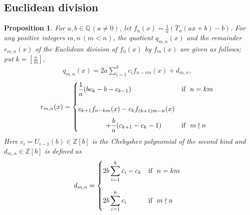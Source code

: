 \documentclass[a4paper, 11pt]{amsart}
\numberwithin{equation}{section}
\newtheorem{prop}[thm]{Proposition}
\theoremstyle{definition}
\newcommand{\Z}{\mathbb{Z}}
\newcommand{\Q}{\mathbb{Q}}
\begin{document}


\subsection{Euclidean division}
\begin{prop}\label{E-Div-T}
For $a, b\in \Q\, (a\neq 0)$, let $f_n(x) = \frac{1}{a} (T_n(ax + b) - b)$.
For any positive integers $m, n\, (m< n)$, the quotient $q_{m,n}(x)$ and the remainder $r_{m,n}(x)$ of the Euclidean division of $f_n(x)$ by $f_m(x)$ are given as follows; put $k=[\frac nm]$,
\begin{align}
q_{m,n}(x)=2a\sum_{i=1}^kc_if_{n-im}(x)+d_{m,n},
\end{align}
\begin{align}
r_{m,n}(x)=
\begin{cases}
\dfrac 1a (bc_k-b-c_{k-1}) &\text{if}\ \ n=km \bigskip\\
c_{k+1}f_{n-km}(x)-c_kf_{(k+1)m-n}(x)\medskip\\\qquad \qquad +\dfrac ba(c_{k+1}-c_{k}-1)& \text{if}\ \ m\nmid n
\end{cases}
\end{align}
Here $c_i=U_{i-1}(b)\in \Z[b]$ is the Chebyshev polynomial of the second kind %
and $d_{m,n}\in \Z[b]$ is defined as
\begin{align*}
d_{m,n}=
\begin{cases}
\displaystyle 2b\sum_{i=1}^kc_i-c_k& \text{if}\ \ n=km \bigskip\\
\displaystyle 2b\sum_{i=1}^{k}c_i& \text{if}\ \ m\nmid n 
\end{cases}
\end{align*}
\end{prop}
\end{document}
